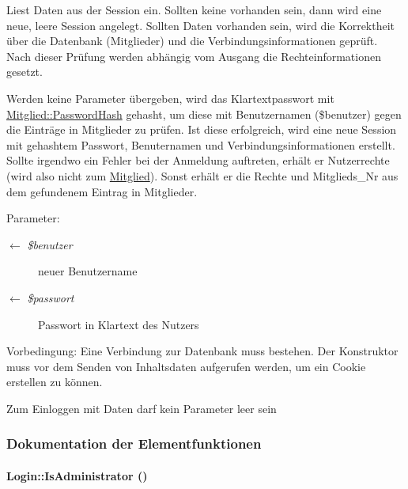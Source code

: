 Liest Daten aus der Session ein. Sollten keine vorhanden sein, dann wird eine neue, leere Session angelegt. Sollten Daten vorhanden sein, wird die Korrektheit über die Datenbank (Mitglieder) und die Verbindungsinformationen geprüft. Nach dieser Prüfung werden abhängig vom Ausgang die Rechteinformationen gesetzt.\par
 Werden keine Parameter übergeben, wird das Klartextpasswort mit \hyperlink{classMitglied_9b13db80866c22bf992e73f2eb75e369}{Mitglied::Password\-Hash} gehasht, um diese mit Benutzernamen (\$benutzer) gegen die Einträge in Mitglieder zu prüfen. Ist diese erfolgreich, wird eine neue Session mit gehashtem Passwort, Benuternamen und Verbindungsinformationen erstellt. Sollte irgendwo ein Fehler bei der Anmeldung auftreten, erhält er Nutzerrechte (wird also nicht zum \hyperlink{classMitglied}{Mitglied}). Sonst erhält er die Rechte und Mitglieds\_\-Nr aus dem gefundenem Eintrag in Mitglieder. \begin{Desc}
\item[Parameter:]
\begin{description}
\item[\mbox{$\leftarrow$} {\em \$benutzer}]neuer Benutzername \item[\mbox{$\leftarrow$} {\em \$passwort}]Passwort in Klartext des Nutzers \end{description}
\end{Desc}
\begin{Desc}
\item[Vorbedingung:]Eine Verbindung zur Datenbank muss bestehen. Der Konstruktor muss vor dem Senden von Inhaltsdaten aufgerufen werden, um ein Cookie erstellen zu können.\par
 Zum Einloggen mit Daten darf kein Parameter leer sein \end{Desc}


\subsubsection{Dokumentation der Elementfunktionen}
\hypertarget{classLogin_6c120224aa6719f58c6ccd08acc28758}{
\paragraph[IsAdministrator]{\setlength{\rightskip}{0pt plus 5cm}Login::Is\-Administrator ()}\hfill}
\label{classLogin_6c120224aa6719f58c6ccd08acc28758}


